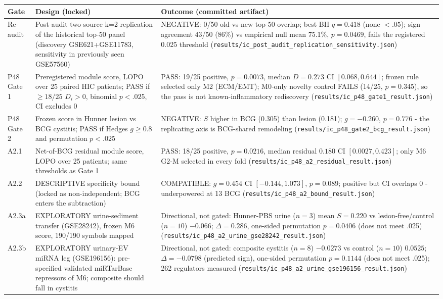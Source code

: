 \begin{longtable}{p{}p{}p{}}
\hline\hline Gate & Design (locked) & Outcome (committed artifact) \\
\hline\endhead
Re-audit & Post-audit two-source k=2 replication of the historical top-50 panel (discovery GSE621+GSE11783, sensitivity in previously seen GSE57560) & NEGATIVE: 0/50 old-vs-new top-50 overlap; best BH $q=0.418$ (none $<.05$); sign agreement 43/50 (86\%) vs empirical null mean 75.1\%, $p=0.0469$, fails the registered 0.025 threshold (\texttt{results/ic\_post\_audit\_replication\_sensitivity.json}) \\
P48 Gate 1 & Preregistered module score, LOPO over 25 paired HIC patients; PASS if $\geq 18/25$ $D_i>0$, binomial $p<.025$, CI excludes 0 & PASS: 19/25 positive, $p=0.0073$, median $D=0.273$ CI $[0.068, 0.644]$; frozen rule selected only M2 (ECM/EMT); M0-only novelty control FAILS (14/25, $p=0.345$), so the pass is not known-inflammatory rediscovery (\texttt{results/ic\_p48\_gate1\_result.json}) \\
P48 Gate 2 & Frozen score in Hunner lesion vs BCG cystitis; PASS if Hedges $g\geq 0.8$ and permutation $p<.025$ & NEGATIVE: $S$ higher in BCG (0.305) than lesion (0.181); $g=-0.260$, $p=0.776$ - the replicating axis is BCG-shared remodeling (\texttt{results/ic\_p48\_gate2\_bcg\_result.json}) \\
A2.1 & Net-of-BCG residual module score, LOPO over 25 patients; same thresholds as Gate 1 & PASS: 18/25 positive, $p=0.0216$, median residual $0.180$ CI $[0.0027, 0.423]$; only M6 G2-M selected in every fold (\texttt{results/ic\_p48\_a2\_residual\_result.json}) \\
A2.2 & DESCRIPTIVE specificity bound (locked as non-independent; BCG enters the subtraction) & COMPATIBLE: $g=0.454$ CI $[-0.144, 1.073]$, $p=0.089$; positive but CI overlaps 0 - underpowered at 13 BCG (\texttt{results/ic\_p48\_a2\_bound\_result.json}) \\
A2.3a & EXPLORATORY urine-sediment transfer (GSE28242), frozen M6 score, 190/190 symbols mapped & Directional, not gated: Hunner-PBS urine ($n=3$) mean $S=0.220$ vs lesion-free/control ($n=10$) $-0.066$; $\Delta=0.286$, one-sided permutation $p=0.0406$ (does not meet .025) (\texttt{results/ic\_p48\_a2\_urine\_gse28242\_result.json}) \\
A2.3b & EXPLORATORY urinary-EV miRNA leg (GSE196156): pre-specified validated miRTarBase repressors of M6; composite should fall in cystitis & Directional, not gated: composite cystitis ($n=8$) $-0.0273$ vs control ($n=10$) $0.0525$; $\Delta=-0.0798$ (predicted sign), one-sided permutation $p=0.1144$ (does not meet .025); 262 regulators measured (\texttt{results/ic\_p48\_a2\_urine\_gse196156\_result.json}) \\
\hline\hline\end{longtable}
